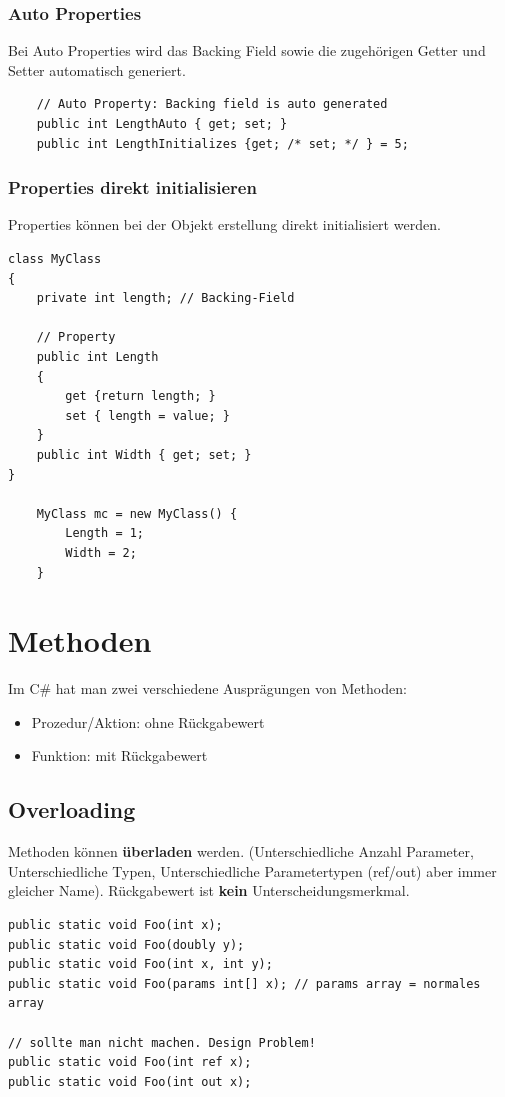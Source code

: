 \documentclass[
a4paper,
oneside,
10pt,
fleqn,
headsepline,
toc=listofnumbered, 
bibliography=totocnumbered]{scrartcl}
\let\stdsection\section
\renewcommand\section{\clearpage\stdsection}
\begin{document}
\subsubsection{Auto Properties}
Bei Auto Properties wird das Backing Field sowie die zugehörigen Getter und Setter automatisch generiert.
\begin{lstlisting}
	// Auto Property: Backing field is auto generated
	public int LengthAuto { get; set; }
	public int LengthInitializes {get; /* set; */ } = 5;
\end{lstlisting}

\subsubsection{Properties direkt initialisieren}
Properties können bei der Objekt erstellung direkt initialisiert werden. 
\begin{lstlisting}
class MyClass
{
    private int length; // Backing-Field
    
    // Property
    public int Length 
    {
        get {return length; }
        set { length = value; } 
    }
    public int Width { get; set; } 
} 

	MyClass mc = new MyClass() {
		Length = 1;
		Width = 2;
	}
\end{lstlisting}

\section{Methoden}
Im C# hat man zwei verschiedene Ausprägungen von Methoden:  
\begin{itemize}
    \item Prozedur/Aktion: ohne Rückgabewert
    \item Funktion: mit Rückgabewert
\end{itemize}
\subsection{Overloading}
Methoden können \textbf{überladen} werden. (Unterschiedliche Anzahl Parameter, Unterschiedliche Typen, Unterschiedliche Parametertypen (ref/out) aber immer gleicher Name). Rückgabewert ist \textbf{kein} Unterscheidungsmerkmal.
\begin{lstlisting}
public static void Foo(int x);
public static void Foo(doubly y);
public static void Foo(int x, int y);
public static void Foo(params int[] x); // params array = normales array

// sollte man nicht machen. Design Problem!
public static void Foo(int ref x);
public static void Foo(int out x);
\end{lstlisting}
\end{document}

